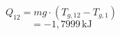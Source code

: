 

\item[c)]
        \[
        Q_{12} = mg \cdot (T_{g,12} - T_{g,1})
        \]
        \[
        = -1{,}7999 \, \text{kJ}
        \]